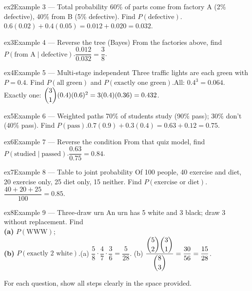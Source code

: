 \documentclass[11pt]{article}
\begin{document}
\begin{example}{ex2}{Example 3 --- Total probability}
60\% of parts come from factory A (2\% defective), 40\% from B (5\% defective). Find $P(\text{defective})$.\soln $0.6(0.02)+0.4(0.05)=0.012+0.020=0.032$.
\end{example}

\begin{example}{ex3}{Example 4 --- Reverse the tree (Bayes)}
From the factories above, find $P(\text{from A}\mid\text{defective})$.\soln $\dfrac{0.012}{0.032}=\dfrac38$.
\end{example}

\begin{example}{ex4}{Example 5 --- Multi-stage independent}
Three traffic lights are each green with $P=0.4$. Find $P(\text{all green})$ and $P(\text{exactly one green})$.\soln All: $0.4^3=0.064$. Exactly one: $\dbinom{3}{1}(0.4)(0.6)^2=3(0.4)(0.36)=0.432$.
\end{example}

\begin{example}{ex5}{Example 6 --- Weighted paths}
70\% of students study (90\% pass); 30\% don't (40\% pass). Find $P(\text{pass})$.\soln $0.7(0.9)+0.3(0.4)=0.63+0.12=0.75$.
\end{example}

\begin{example}{ex6}{Example 7 --- Reverse the condition}
From that quiz model, find $P(\text{studied}\mid\text{passed})$.\soln $\dfrac{0.63}{0.75}=0.84$.
\end{example}

\begin{example}{ex7}{Example 8 --- Table to joint probability}
Of 100 people, 40 exercise and diet, 20 exercise only, 25 diet only, 15 neither. Find $P(\text{exercise or diet})$.\soln $\dfrac{40+20+25}{100}=0.85$.
\end{example}

\begin{example}{ex8}{Example 9 --- Three-draw urn}
An urn has 5 white and 3 black; draw 3 without replacement. Find \\ \textbf{(a)} $P(\text{WWW})$; \\ \textbf{(b)} $P(\text{exactly 2 white})$.\soln (a) $\dfrac58\cdot\dfrac47\cdot\dfrac36=\dfrac{5}{28}$. (b) $\dfrac{\dbinom{5}{2}\dbinom{3}{1}}{\dbinom{8}{3}}=\dfrac{30}{56}=\dfrac{15}{28}$.
\end{example}

\clearpage
{}
For each question, show all steps clearly in the space provided.
\end{document}
